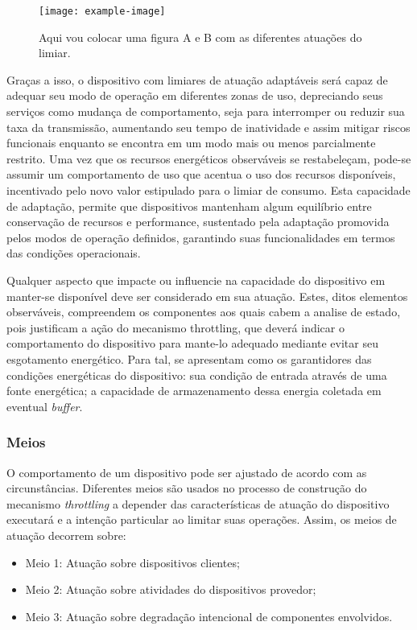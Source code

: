 \begin{itemize}
    \begin{figure}[h]
    	\centering
    	\texttt{[image: example-image]} 
    	\caption{Aqui vou colocar uma figura A e B com as diferentes atuações do limiar.}
    \end{figure}
    
    
\end{itemize}

Graças a isso, o dispositivo com limiares de atuação adaptáveis será capaz de adequar seu modo de operação em diferentes zonas de uso, depreciando seus serviços como mudança de comportamento, seja para interromper ou reduzir sua taxa da transmissão, aumentando seu tempo de inatividade e assim mitigar riscos funcionais enquanto se encontra em um modo mais ou menos parcialmente restrito. Uma vez que os recursos energéticos observáveis se restabeleçam, pode-se assumir um comportamento de uso que acentua o uso dos recursos disponíveis, incentivado pelo novo valor estipulado para o limiar de consumo. Esta capacidade de adaptação, permite que dispositivos mantenham algum equilíbrio entre conservação de recursos e performance, sustentado pela adaptação promovida pelos modos de operação definidos, garantindo suas funcionalidades em termos das condições operacionais.


Qualquer aspecto que impacte ou influencie na capacidade do dispositivo em manter-se disponível deve ser considerado em sua atuação. Estes, ditos elementos observáveis, compreendem os componentes aos quais cabem a analise de estado, pois justificam a ação do mecanismo throttling, que deverá indicar o comportamento do dispositivo para mante-lo adequado mediante evitar seu esgotamento energético. Para tal, se apresentam como os garantidores das condições energéticas do dispositivo: sua condição de entrada através de uma fonte energética; a capacidade de armazenamento dessa energia coletada em eventual \textit{buffer}. 

\subsubsection{Meios}
\label{cap4:atuacao_meios}
O comportamento de um dispositivo pode ser ajustado de acordo com as circunstâncias. Diferentes meios são usados no processo de construção do mecanismo \textit{throttling} a depender das características de atuação do dispositivo executará e a intenção particular ao limitar suas operações. Assim, os meios de atuação decorrem sobre:

\begin{itemize}
	\item Meio 1: Atuação sobre dispositivos clientes; 
	\item Meio 2:\label{meio2} Atuação sobre atividades do dispositivos provedor;
	\item Meio 3:\label{meio3} Atuação sobre degradação intencional de componentes envolvidos.
\end{itemize}

